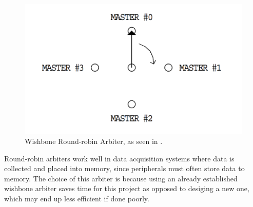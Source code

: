 %
%
\begin{figure}[htb]
    \centering
    \includegraphics[width=1.0\textwidth]{Figures/Tile/WBArbiter}
    \caption{Wishbone Round-robin Arbiter, as seen in \cite{WBLibrary}.}
    \label{fig:WBArbiter}
\end{figure}

Round-robin arbiters work well in data acquisition systems where data is collected and placed into memory, since peripherals must often store data to memory.
The choice of this arbiter is because using an already established wishbone arbiter saves time for this project as opposed to desiging a new one, which may end up less efficient if done poorly.


